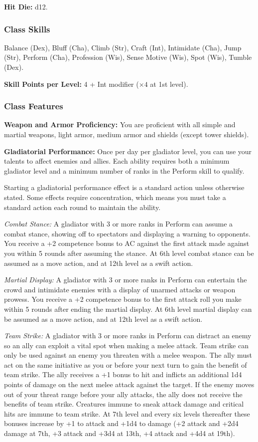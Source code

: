 \textbf{Hit Die:} d12.

\subsubsection{Class Skills}
Balance (Dex), Bluff (Cha), Climb (Str), Craft (Int), Intimidate (Cha), Jump (Str), Perform (Cha), Profession (Wis), Sense Motive (Wis), Spot (Wis), Tumble (Dex).

\textbf{Skill Points per Level:} 4 + Int modifier ($\times4$ at 1st level).

\subsubsection{Class Features}

\textbf{Weapon and Armor Proficiency:} You are proficient with all simple and martial weapons, light armor, medium armor and shields (except tower shields).

\textbf{Gladiatorial Performance:} Once per day per gladiator level, you can use your talents to affect enemies and allies. Each ability requires both a minimum gladiator level and a minimum number of ranks in the Perform skill to qualify.

Starting a gladiatorial performance effect is a standard action unless otherwise stated. Some effects require concentration, which means you must take a standard action each round to maintain the ability.

\textit{Combat Stance:} A gladiator with 3 or more ranks in Perform can assume a combat stance, showing off to spectators and displaying a warning to opponents. You receive a +2 competence bonus to AC against the first attack made against you within 5 rounds after assuming the stance. At 6th level combat stance can be assumed as a move action, and at 12th level as a swift action.

\textit{Martial Display:} A gladiator with 3 or more ranks in Perform can entertain the crowd and intimidate enemies with a display of unarmed attacks or weapon prowess. You receive a +2 competence bonus to the first attack roll you make within 5 rounds after ending the martial display. At 6th level martial display can be assumed as a move action, and at 12th level as a swift action.

\textit{Team Strike:} A gladiator with 3 or more ranks in Perform can distract an enemy so an ally can exploit a vital spot when making a melee attack. Team strike can only be used against an enemy you threaten with a melee weapon. The ally must act on the same initiative as you or before your next turn to gain the benefit of team strike. The ally receives a +1 bonus to hit and inflicts an additional 1d4 points of damage on the next melee attack against the target. If the enemy moves out of your threat range before your ally attacks, the ally does not receive the benefits of team strike. Creatures immune to sneak attack damage and critical hits are immune to team strike. At 7th level and every six levels thereafter these bonuses increase by +1 to attack and +1d4 to damage (+2 attack and +2d4 damage at 7th, +3 attack and +3d4 at 13th, +4 attack and +4d4 at 19th).

